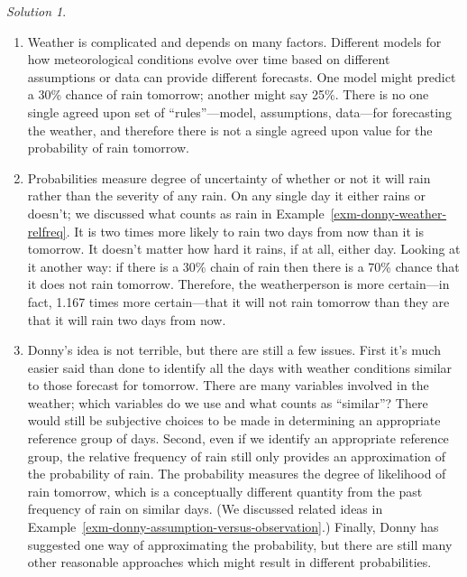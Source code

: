 \documentclass[
  letterpaper,
  DIV=11,
  numbers=noendperiod]{scrreprt}
\providecommand{\tightlist}{%
  \setlength{\itemsep}{0pt}\setlength{\parskip}{0pt}}
\theoremstyle{plain}
\theoremstyle{definition}
\theoremstyle{definition}
\theoremstyle{definition}
\theoremstyle{remark}
\newtheorem{refsolution}{Solution}[chapter]
\begin{document}
\begin{tcolorbox}[enhanced jigsaw, opacityback=0, rightrule=.15mm, coltitle=black, colframe=quarto-callout-tip-color-frame, toprule=.15mm, colbacktitle=quarto-callout-tip-color!10!white, opacitybacktitle=0.6, left=2mm, toptitle=1mm, breakable, title={Solution (click to expand)}, bottomtitle=1mm, colback=white, leftrule=.75mm, titlerule=0mm, arc=.35mm, bottomrule=.15mm]

\begin{refsolution}
\leavevmode

\begin{enumerate}
\def\labelenumi{\arabic{enumi}.}
\tightlist
\item
  Weather is complicated and depends on many factors. Different models
  for how meteorological conditions evolve over time based on different
  assumptions or data can provide different forecasts. One model might
  predict a 30\% chance of rain tomorrow; another might say 25\%. There
  is no one single agreed upon set of ``rules''---model, assumptions,
  data---for forecasting the weather, and therefore there is not a
  single agreed upon value for the probability of rain tomorrow.
\item
  Probabilities measure degree of uncertainty of whether or not it will
  rain rather than the severity of any rain. On any single day it either
  rains or doesn't; we discussed what counts as rain in
  Example~\ref{exm-donny-weather-relfreq}. It is two times more likely
  to rain two days from now than it is tomorrow. It doesn't matter how
  hard it rains, if at all, either day. Looking at it another way: if
  there is a 30\% chain of rain then there is a 70\% chance that it does
  not rain tomorrow. Therefore, the weatherperson is more certain---in
  fact, 1.167 times more certain---that it will not rain tomorrow than
  they are that it will rain two days from now.
\item
  Donny's idea is not terrible, but there are still a few issues. First
  it's much easier said than done to identify all the days with weather
  conditions similar to those forecast for tomorrow. There are many
  variables involved in the weather; which variables do we use and what
  counts as ``similar''? There would still be subjective choices to be
  made in determining an appropriate reference group of days. Second,
  even if we identify an appropriate reference group, the relative
  frequency of rain still only provides an approximation of the
  probability of rain. The probability measures the degree of likelihood
  of rain tomorrow, which is a conceptually different quantity from the
  past frequency of rain on similar days. (We discussed related ideas in
  Example~\ref{exm-donny-assumption-versus-observation}.) Finally, Donny
  has suggested one way of approximating the probability, but there are
  still many other reasonable approaches which might result in different
  probabilities.
\end{enumerate}

\label{sol-donny-weather-subjective}

\end{refsolution}

\end{tcolorbox}
\end{document}
